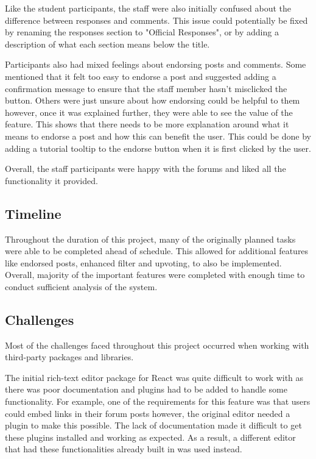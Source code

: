 Like the student participants, the staff were also initially confused about the difference between responses and comments.
This issue could potentially be fixed by renaming the responses section to "Official Responses", or by adding a description of what each section means below the title.

Participants also had mixed feelings about endorsing posts and comments.
Some mentioned that it felt too easy to endorse a post and suggested adding a confirmation message to ensure that the staff member hasn't misclicked the button.
Others were just unsure about how endorsing could be helpful to them however, once it was explained further, they were able to see the value of the feature.
This shows that there needs to be more explanation around what it means to endorse a post and how this can benefit the user.
This could be done by adding a tutorial tooltip to the endorse button when it is first clicked by the user.

Overall, the staff participants were happy with the forums and liked all the functionality it provided.

\subsection{Timeline}

Throughout the duration of this project, many of the originally planned tasks were able to be completed ahead of schedule.
This allowed for additional features like endorsed posts, enhanced filter and upvoting, to also be implemented.
Overall, majority of the important features were completed with enough time to conduct sufficient analysis of the system.

\subsection{Challenges}

Most of the challenges faced throughout this project occurred when working with third-party packages and libraries.

The initial rich-text editor package for React was quite difficult to work with as there was poor documentation and plugins had to be added to handle some functionality.
For example, one of the requirements for this feature was that users could embed links in their forum posts however, the original editor needed a plugin to make this possible.
The lack of documentation made it difficult to get these plugins installed and working as expected.
As a result, a different editor that had these functionalities already built in was used instead.


